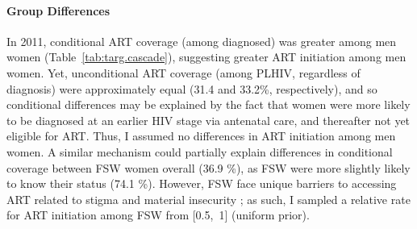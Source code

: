 \paragraph{Group Differences}
In 2011, conditional ART coverage (among diagnosed) was greater among men \vs women
(Table~\ref{tab:targ.cascade}),
suggesting greater ART initiation among men \vs women.
Yet, unconditional ART coverage (among PLHIV, regardless of diagnosis)
were approximately equal (31.4 and 33.2\%, respectively),
and so conditional differences may be explained by the fact that
women were more likely to be diagnosed at an earlier HIV stage via antenatal care,
and thereafter not yet eligible for ART.
Thus, I assumed no differences in ART initiation among men \vs women.
A similar mechanism could partially explain
differences in conditional coverage between FSW \vs women overall (36.9 \%),
as FSW were more slightly likely to know their status (74.1 \%).
However, FSW face unique barriers to accessing ART
related to stigma and material insecurity \cite{Lancaster2016};
as such, I sampled a relative rate for ART initiation among FSW from [0.5,~1] (uniform prior).
